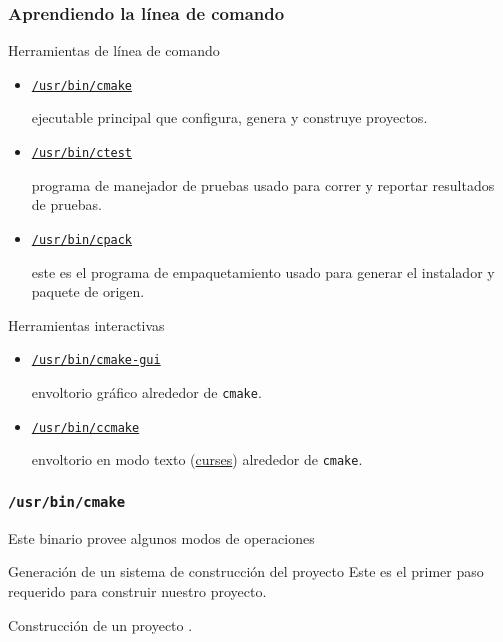 \begin{frame}[fragile]
	\frametitle{Aprendiendo la línea de comando}
	\begin{block}{Herramientas de línea de comando}
		\begin{itemize}
			\item
			
			\href{https://man.archlinux.org/man/cmake.1}{\lstinline{/usr/bin/cmake}}

			ejecutable principal que configura, genera y construye proyectos.
			
			\item
			
			\href{https://man.archlinux.org/man/ctest.1}{\lstinline{/usr/bin/ctest}}
			
			programa de manejador de pruebas usado para correr y
			reportar resultados de pruebas.

			\item
			
			\href{https://man.archlinux.org/man/cpack.1}{\lstinline{/usr/bin/cpack}}

			este es el programa de empaquetamiento usado para generar
			el instalador y paquete de origen.
		\end{itemize}
	\end{block}
		
	\begin{block}{Herramientas interactivas}
		\begin{itemize}
			\item

			\href{https://man.archlinux.org/man/cmake-gui.1}{\lstinline{/usr/bin/cmake-gui}}

			envoltorio gráfico alrededor de \lstinline{cmake}.
			
			\item
			
			\href{https://man.archlinux.org/man/ccmake.1}{\lstinline{/usr/bin/ccmake}}

			envoltorio en modo texto
			(\href{https://es.wikipedia.org/wiki/Curses}{curses}) alrededor de \lstinline{cmake}.
		\end{itemize}
	\end{block}
\end{frame}

\begin{frame}[fragile]
	\frametitle{\lstinline{/usr/bin/cmake}}
	Este binario provee algunos modos de operaciones

	\begin{block}{Generación de un sistema de construcción del proyecto}
		Este es el primer paso requerido para construir nuestro
		proyecto.
	\end{block}
	
	\begin{block}{Construcción de un proyecto}
		.
	\end{block}
\end{frame}

